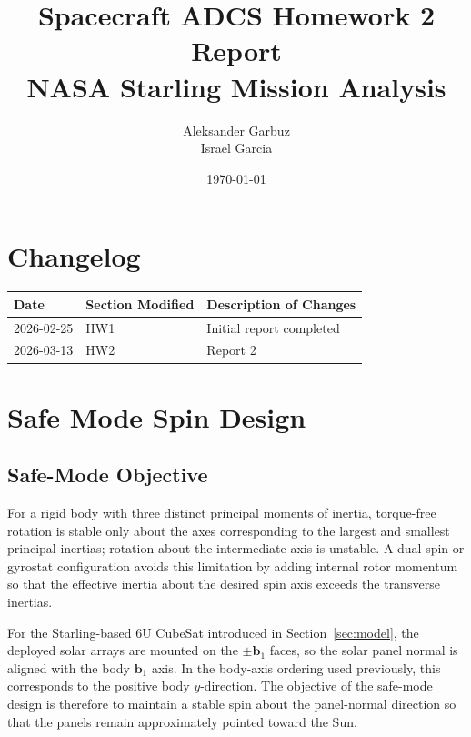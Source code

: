 \documentclass[12pt]{article}
\title{Spacecraft ADCS Homework 2 Report\\
NASA Starling Mission Analysis}
\author{Aleksander Garbuz \\ Israel Garcia}
\date{\today}
\begin{document}
\maketitle


\section*{Changelog}

\begin{center}
\begin{tabular}{| m{3cm} | m{4cm} | m{6cm} |}
\hline
\textbf{Date} & \textbf{Section Modified} & \textbf{Description of Changes} \\
\hline
2026-02-25 & HW1 & Initial report completed \\
2026-03-13 & HW2 & Report 2 \\
\hline
\end{tabular}
\end{center}

\vspace{1cm}
\section{Safe Mode Spin Design}

\subsection{Safe-Mode Objective}
For a rigid body with three distinct principal moments of inertia, torque-free rotation is stable only about the axes corresponding to the largest and smallest principal inertias; rotation about the intermediate axis is unstable. A dual-spin or gyrostat configuration avoids this limitation by adding internal rotor momentum so that the effective inertia about the desired spin axis exceeds the transverse inertias.

For the Starling-based 6U CubeSat introduced in Section~\ref{sec:model}, the
deployed solar arrays are mounted on the $\pm \mathbf{b}_1$ faces, so the solar
panel normal is aligned with the body $\mathbf{b}_1$ axis. In the body-axis ordering
used previously, this corresponds to the positive body $y$-direction. The objective
of the safe-mode design is therefore to maintain a stable spin about the panel-normal
direction so that the panels remain approximately pointed toward the Sun.
\end{document}
